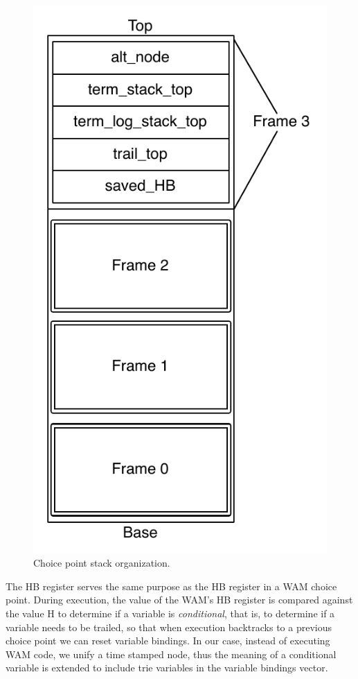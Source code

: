 \begin{figure}[H]
  \centering
    \includegraphics[scale=0.45]{choice_point_stack.pdf}
  \caption{Choice point stack organization.}
  \label{fig:choice_point_stack}
\end{figure}

The HB register serves the same purpose as the HB register in a WAM choice point. During execution, the value
of the WAM's HB register is compared against the value H to determine if a variable is \textit{conditional},
that is, to determine if a variable needs to be trailed, so that when execution backtracks to a previous choice
point we can reset variable bindings. In our case, instead of executing WAM code, we unify a time stamped node,
thus the meaning of a conditional variable is extended to include trie variables in the variable bindings vector.

